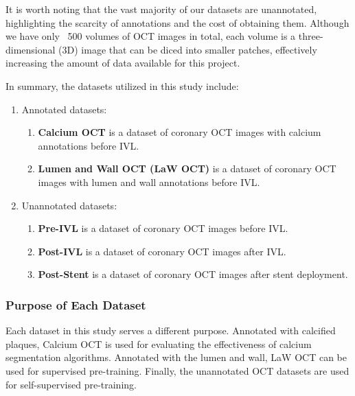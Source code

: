 \documentclass[a4paper,11pt,oneside]{report}
\begin{document}
It is worth noting that the vast majority of our datasets are unannotated, highlighting the scarcity of annotations and the cost of obtaining them. Although we have only ~500 volumes of OCT images in total, each volume is a three-dimensional (3D) image that can be diced into smaller patches, effectively increasing the amount of data available for this project. 

In summary, the datasets utilized in this study include:

\begin{enumerate}
    \item Annotated datasets:
    \begin{enumerate}
        \item \label{enum:calcium-dataset} \textbf{Calcium OCT} is a dataset of coronary OCT images with calcium annotations before IVL.
        \item \label{enum:lumen-and-wall-dataset} \textbf{Lumen and Wall OCT (LaW OCT)} is a dataset of coronary OCT images with lumen and wall annotations before IVL.
    \end{enumerate}
    \item \label{enum:unannotated-dataset} Unannotated datasets:
    \begin{enumerate}
        \item \textbf{Pre-IVL} is a dataset of coronary OCT images before IVL.
        \item \textbf{Post-IVL} is a dataset of coronary OCT images after IVL.
        \item \textbf{Post-Stent} is a dataset of coronary OCT images after stent deployment.
    \end{enumerate}
\end{enumerate}

\subsubsection{Purpose of Each Dataset}

Each dataset in this study serves a different purpose. Annotated with calcified plaques, Calcium OCT is used for evaluating the effectiveness of calcium segmentation algorithms. Annotated with the lumen and wall, LaW OCT can be used for supervised pre-training. Finally, the unannotated OCT datasets are used for self-supervised pre-training. 
\end{document}
